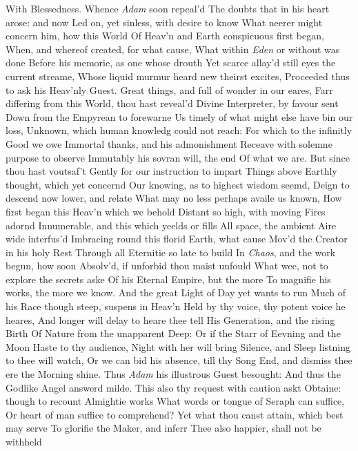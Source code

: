 \documentclass[11pt]{book}
\newcounter {first}
\begin{document}
With Blessedness.  Whence \textit{Adam} soon repeal'd 
The doubts that in his heart arose: and now 
Led on, yet sinless, with desire to know 
What neerer might concern him, how this World 
Of Heav'n and Earth conspicuous first began, 
When, and whereof created, for what cause, 
What within \textit{Eden} or without was done 
Before his memorie, as one whose drouth 
Yet scarce allay'd still eyes the current streame, 
Whose liquid murmur heard new theirst excites, 
Proceeded thus to ask his Heav'nly Guest. 
\quad Great things, and full of wonder in our eares, 
Farr differing from this World, thou hast reveal'd 
Divine Interpreter, by favour sent 
Down from the Empyrean to forewarne 
Us timely of what might else have bin our loss, 
Unknown, which human knowledg could not reach: 
For which to the infinitly Good we owe 
Immortal thanks, and his admonishment 
Receave with solemne purpose to observe 
Immutably his sovran will, the end 
Of what we are.  But since thou hast voutsaf't 
Gently for our instruction to impart 
Things above Earthly thought, which yet concernd 
Our knowing, as to highest wisdom seemd, 
Deign to descend now lower, and relate 
What may no less perhaps availe us known, 
How first began this Heav'n which we behold 
Distant so high, with moving Fires adornd 
Innumerable, and this which yeelds or fills 
All space, the ambient Aire wide interfus'd 
Imbracing round this florid Earth, what cause 
Mov'd the Creator in his holy Rest 
Through all Eternitie so late to build 
In \textit{Chaos}, and the work begun, how soon 
Absolv'd, if unforbid thou maist unfould 
What wee, not to explore the secrets aske 
Of his Eternal Empire, but the more 
To magnifie his works, the more we know. 
And the great Light of Day yet wants to run 
Much of his Race though steep, suspens in Heav'n 
Held by thy voice, thy potent voice he heares, 
And longer will delay to heare thee tell 
His Generation, and the rising Birth 
Of Nature from the unapparent Deep: 
Or if the Starr of Eevning and the Moon 
Haste to thy audience, Night with her will bring 
Silence, and Sleep listning to thee will watch, 
Or we can bid his absence, till thy Song 
End, and dismiss thee ere the Morning shine. 
\quad Thus \textit{Adam} his illustrous Guest besought: 
\quad And thus the Godlike Angel answerd milde. 
This also thy request with caution askt 
Obtaine: though to recount Almightie works 
What words or tongue of Seraph can suffice, 
Or heart of man suffice to comprehend? 
Yet what thou canst attain, which best may serve 
To glorifie the Maker, and inferr 
Thee also happier, shall not be withheld 
\end{document}
